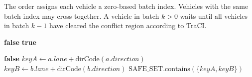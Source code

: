 \documentclass[fleqn,10pt]{olplainarticle}
\begin{document}
The order assigns each vehicle a zero-based batch index. Vehicles with the same batch index may cross together. A vehicle in batch $k>0$ waits until all vehicles in batch $k-1$ have cleared the conflict region according to TraCI.

\begin{algorithm}[H]
\caption{\textsc{IsSameLaneFrontPlaced}$(v,\ view,\ placed)$}
\begin{algorithmic}[1]
        \State \Return \textbf{false}
    \EndIf
\EndFor
\State \Return \textbf{true}
\end{algorithmic}
\end{algorithm}

\begin{algorithm}[H]
\caption{\textsc{IsSafeToBatch}$(a,\ b)$}
\begin{algorithmic}[1]
    \State \Return \textbf{false} 
\EndIf
\State $keyA \gets a.lane + \text{dirCode}(a.direction)$
\State $keyB \gets b.lane + \text{dirCode}(b.direction)$
\State \Return $\text{SAFE\_SET.contains}(\{keyA, keyB\})$
\end{algorithmic}
\end{algorithm}
\end{document}
